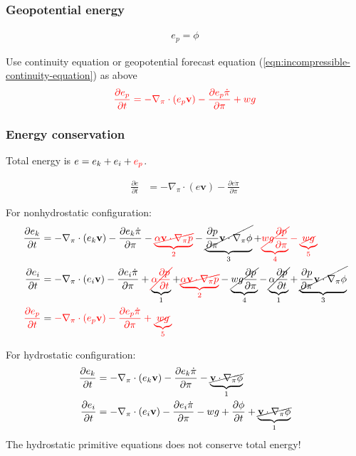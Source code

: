 \documentclass[12pt]{article}
\newcommand{\pd}[2]{\frac{\partial #1}{\partial #2}}
\newcommand{\pdt}[1]{\pd{#1}{t}}
\newcommand{\pdz}[1]{\pd{#1}{\pi}}
\renewcommand{\vec}[1]{\mathbf{#1}}
\begin{document}
\subsubsection{Geopotential energy}

\begin{align*}
  e_p = \phi
\end{align*}

Use continuity equation or geopotential forecast equation (\ref{eqn:incompressible-continuity-equation}) as above
\begin{equation*}
  {\color{red}\pdt{e_p} = - \nabla_\pi \cdot \left(e_p \vec{v}\right) - \pdz{e_p \dot{\pi}} + w g}
\end{equation*}

\subsubsection{Energy conservation}

Total energy is $e = e_k + e_i + {\color{red}e_p}$.

\begin{align*}
  \pdt{e} & = - \nabla_\pi \cdot \left(e \vec{v}\right) - \pdz{e \dot{\pi}}
\end{align*}

For nonhydrostatic configuration:
\begin{align*}
  \pdt{e_k} & = - \nabla_\pi \cdot \left(e_k \vec{v}\right) - \pdz{e_k \dot{\pi}} - {\color{red}\underbrace{\cancel{\alpha \vec{v} \cdot \nabla_\pi p}}_2} - \underbrace{\cancel{\pd{p}{\pi} \vec{v} \cdot \nabla_\pi \phi}}_3 + {\color{red}\underbrace{\cancel{w g \pd{p}{\pi}}}_4 - \underbrace{\cancel{w g}}_5} \\
  \pdt{e_i} & = - \nabla_\pi \cdot \left(e_i \vec{v}\right) - \pdz{e_i \dot{\pi}} + \underbrace{\color{red}\cancel{\alpha \pdt{p}}}_1 + {\color{red}\underbrace{\cancel{\alpha \vec{v} \cdot \nabla_\pi p}}_2} - \underbrace{\cancel{w g \pd{p}{\pi}}}_4 - \underbrace{\cancel{\alpha \pdt{p}}}_1 + \underbrace{\cancel{\pd{p}{\pi} \vec{v} \cdot \nabla_\pi \phi}}_3 \\
  {\color{red}\pdt{e_p}} & = {\color{red}- \nabla_\pi \cdot \left(e_p \vec{v}\right) - \pdz{e_p \dot{\pi}} + \underbrace{\cancel{w g}}_5}
\end{align*}

For hydrostatic configuration:
\begin{align*}
  \pdt{e_k} & = - \nabla_\pi \cdot \left(e_k \vec{v}\right) - \pdz{e_k \dot{\pi}} - \underbrace{\cancel{\vec{v} \cdot \nabla_\pi \phi}}_1 \\
  \pdt{e_i} & = - \nabla_\pi \cdot \left(e_i \vec{v}\right) - \pdz{e_i \dot{\pi}} - w g + \pdt{\phi} + \underbrace{\cancel{\vec{v} \cdot \nabla_\pi \phi}}_1
\end{align*}
The hydrostatic primitive equations does not conserve total energy!
\end{document}
